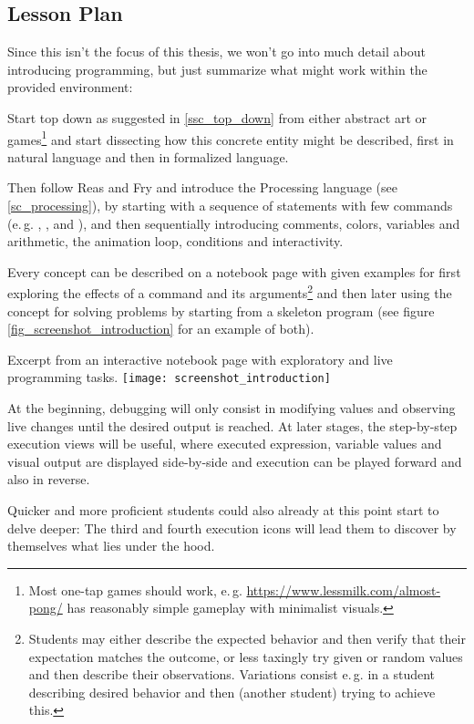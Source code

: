 \subsection{Lesson Plan}

Since this isn't the focus of this thesis, we won't go into much detail about introducing programming, but just summarize what might work within the provided environment:

Start top down as suggested in \ref{ssc_top_down} from either abstract art or games\footnote{Most one-tap games should work, e.\,g. \url{https://www.lessmilk.com/almost-pong/} has reasonably simple gameplay with minimalist visuals.} and start dissecting how this concrete entity might be described, first in natural language and then in formalized language.

Then follow Reas and Fry \cite{Rea14} and introduce the Processing language (see \ref{sc_processing}), by starting with a sequence of statements with few commands (e.\,g. , ,  and ), and then sequentially introducing comments, colors, variables and arithmetic, the animation loop, conditions and interactivity.

Every concept can be described on a notebook page with given examples for first exploring the effects of a command and its arguments\footnote{Students may either describe the expected behavior and then verify that their expectation matches the outcome, or less taxingly try given or random values and then describe their observations. Variations consist e.\,g. in a student describing desired behavior and then (another student) trying to achieve this.} and then later using the concept for solving problems by starting from a skeleton program (see figure \ref{fig_screenshot_introduction} for an example of both).

\begin{cfigure}{Excerpt from an interactive notebook page with exploratory and live programming tasks.}
\texttt{[image: screenshot\_introduction]}
\end{cfigure}

At the beginning, debugging will only consist in modifying values and observing live changes until the desired output is reached. At later stages, the step-by-step execution views will be useful, where executed expression, variable values and visual output are displayed side-by-side and execution can be played forward and also in reverse.

Quicker and more proficient students could also already at this point start to delve deeper: The third and fourth execution icons will lead them to discover by themselves what lies under the hood.

